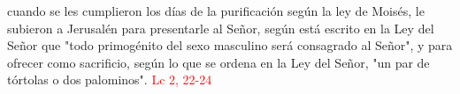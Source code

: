  cuando se les cumplieron los días de la purificación según la ley de Moisés, le subieron a Jerusalén para presentarle al Señor,
según está escrito en la Ley del Señor que "todo primogénito del sexo masculino será consagrado al Señor", y para ofrecer como sacrificio,
según lo que se ordena en la Ley del Señor, "un par de tórtolas o dos palominos". \textcolor{red}{Lc 2, 22-24}